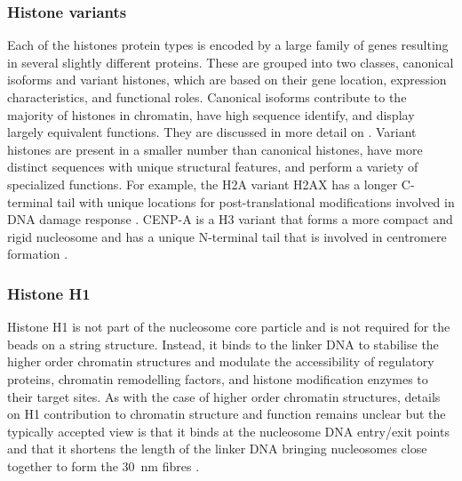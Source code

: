     \subsubsection{Histone variants}

      Each of the histones protein types is encoded by a large family
      of genes resulting in several slightly different proteins.
      These are grouped into two classes, canonical isoforms
      and variant histones, which are based on their gene location,
      expression characteristics, and functional roles.
      Canonical isoforms contribute to the majority
      of histones in chromatin, have high sequence identify, and display
      largely equivalent functions.  They are discussed in more detail on
      .
      Variant histones are present in a smaller number than canonical
      histones, have more distinct sequences with unique structural features,
      and perform a variety of specialized functions.  For example, the
      H2A variant H2AX has a longer C-terminal tail with unique locations
      for post-translational modifications involved in DNA damage
      response .  CENP-A is a H3 variant that
      forms a more compact and rigid nucleosome and has a unique N-terminal
      tail that is involved in centromere formation \citep{black2011-cenpa}.

    \subsubsection{Histone H1}

      Histone H1 is not part of the nucleosome core particle and is not
      required for the beads on a string structure.
      Instead, it binds to the linker DNA
      to stabilise the higher order
      chromatin structures and modulate the accessibility of
      regulatory proteins,
      chromatin remodelling factors, and histone modification enzymes
      to their target sites.
      As with the case of higher order chromatin structures, details
      on H1 contribution to chromatin structure and function remains
      unclear but the typically accepted view is that it binds at
      the nucleosome DNA entry/exit points and that it shortens the
      length of the linker DNA bringing nucleosomes close together
      to form the \SI{30}{\nm} fibres \citep{harshman2013h1-review}.

